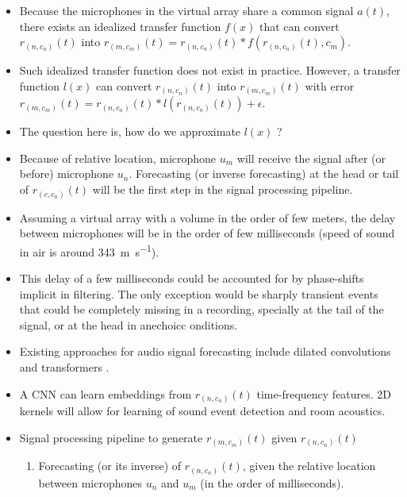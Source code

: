 \documentclass[14pt]{extarticle}
\begin{document}
\begin{itemize}
\item Because the microphones in the virtual array share a common signal $a(t)$, there exists an idealized transfer function $f(x)$ that can convert $r_{(n,c_n)}(t)$ into $r_{(m,c_m)}(t) = r_{(n,c_n)}(t) \ast f(r_{(n,c_n)}(t),c_m)$. 

\item Such idealized transfer function does not exist in practice. However, a transfer function $l(x)$ can convert $r_{(n,c_n)}(t)$ into $r_{(m,c_m)}(t)$ with error $r_{(m,c_m)}(t) = r_{(n,c_n)}(t) \ast l(r_{(n,c_n)}(t)) + \epsilon$.

\item The question here is, how do we approximate $l(x)$ ?

\item Because of relative location, microphone $u_m$ will receive the signal after (or before) microphone $u_n$. Forecasting (or inverse forecasting) at the head or tail of $r_{(c,c_n)}(t)$ will be the first step in the signal processing pipeline. 

\item Assuming a virtual array with a volume in the order of few meters, the delay between microphones will be in the order of few milliseconds (speed of sound in air is around \SI{343}{\metre\per\second}).

\item This delay of a few milliseconds could be accounted for by phase-shifts implicit in filtering. The only exception would be sharply transient events that could be completely missing in a recording, specially at the tail of the signal, or at the head in anechoicc onditions.

\item Existing approaches for audio signal forecasting include dilated convolutions \cite{oord2016wavenet} and transformers \cite{child2019generating}. 

\item A CNN can learn embeddings from $r_{(n,c_n)}(t)$ time-frequency features. 2D kernels will allow for learning of sound event detection and room acoustics. 

\item Signal processing pipeline to generate $r_{(m,c_m)}(t)$ given $r_{(n,c_n)}(t)$
	\begin{enumerate}

	\item Forecasting (or its inverse) of $r_{(n,c_n)}(t)$, given the relative location between microphones $u_n$ and $u_m$ (in the order of milliseconds).


\end{enumerate}
\end{itemize}
\end{document}

